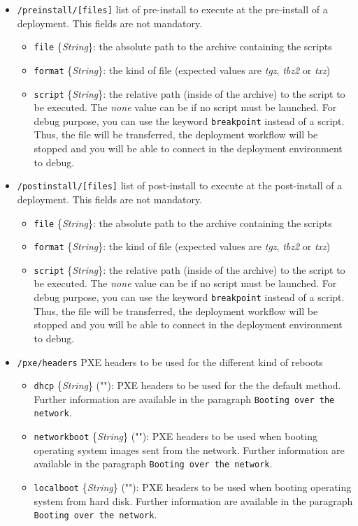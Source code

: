 \documentclass[a4wide,10pt,oneside]{book}
\newcommand{\ypath}[1]{\texttt{#1}}
\newcommand{\yfield}[2]{\texttt{#1} {\small\{{\emph{#2}}\}}:}
\newcommand{\yfieldd}[3]{\texttt{#1} {\small\{{\emph{#2}}\}} {\small(}#3{\small)}:}
\begin{document}
\begin{itemize}
  \item \ypath{/preinstall/[files]} list of pre-install to execute at the pre-install of a deployment. This fields are not mandatory.
  \begin{itemize}
    \item \yfield{file}{String} the absolute path to the archive containing the scripts
    \item \yfield{format}{String} the kind of file (expected values are \emph{tgz}, \emph{tbz2} or \emph{txz})
    \item \yfield{script}{String} the relative path (inside of the archive) to the script to be executed. The \textit{none} value can be if no script must be launched. For debug purpose, you can use the keyword \texttt{breakpoint} instead of a script. Thus, the file will be transferred, the deployment workflow will be stopped and you will be able to connect in the deployment environment to debug.
  \end{itemize}

  \item \ypath{/postinstall/[files]} list of post-install to execute at the post-install of a deployment. This fields are not mandatory.
  \begin{itemize}
    \item \yfield{file}{String} the absolute path to the archive containing the scripts
    \item \yfield{format}{String} the kind of file (expected values are \emph{tgz}, \emph{tbz2} or \emph{txz})
    \item \yfield{script}{String} the relative path (inside of the archive) to the script to be executed. The \textit{none} value can be if no script must be launched. For debug purpose, you can use the keyword \texttt{breakpoint} instead of a script. Thus, the file will be transferred, the deployment workflow will be stopped and you will be able to connect in the deployment environment to debug.
  \end{itemize}

  \item \ypath{/pxe/headers} PXE headers to be used for the different kind of reboots
  \begin{itemize}
    \item \yfieldd{dhcp}{String}{""} PXE headers to be used for the the default method. Further information are available in the paragraph \texttt{Booting over the network}.
    \item \yfieldd{networkboot}{String}{""} PXE headers to be used when booting operating system images sent from the network. Further information are available in the paragraph \texttt{Booting over the network}.
    \item \yfieldd{localboot}{String}{""} PXE headers to be used when booting operating system from hard disk. Further information are available in the paragraph \texttt{Booting over the network}.
  \end{itemize}


\end{itemize}
\end{document}
